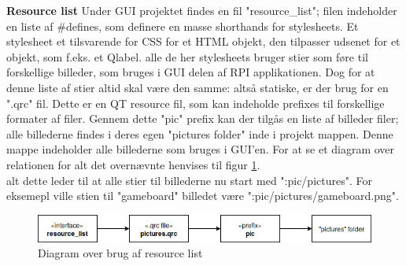 \documentclass[Softwaredesign/Softwaredesign_main.tex]{subfiles}
\begin{document}
\textbf{Resource list}
Under GUI projektet findes en fil "resource\_list"; filen indeholder en liste af #defines, som definere en masse shorthands for stylesheets. Et stylesheet et tilsvarende for CSS for et HTML objekt, den tilpasser udsenet for et objekt, som f.eks. et Qlabel. alle de her stylesheets bruger stier som føre til forskellige billeder,  som bruges i GUI delen af RPI applikationen.  Dog for at denne liste af stier altid skal være den samme: altså statiske, er der brug for en ".qrc" fil. Dette er en QT resource fil, som kan indeholde prefixes til forskellige formater af filer.  Gennem dette "pic" prefix kan der tilgås en liste af billeder filer;  alle billederne findes i deres egen "pictures folder" inde i projekt mappen. Denne mappe indeholder alle billederne som bruges i GUI'en.  For at se et diagram over relationen for alt det overnævnte henvises til figur \ref{fig:resource_list}.
\\
alt dette leder til at alle stier til billederne nu start med ":pic/pictures". For eksemepl ville stien til "gameboard" billedet være ":pic/pictures/gameboard.png".
\begin{figure}
    \centering
    \includegraphics[scale=0.5]{Softwaredesign/GUI/Pictures/resource_list.png}
    \caption{Diagram over brug af resource list}
    \label{fig:resource_list}
\end{figure}
\end{document}
